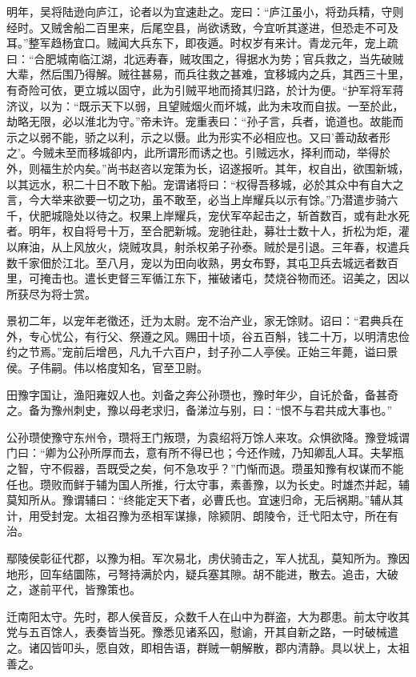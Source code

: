 \documentclass[12pt,UTF8]{ctexbook}
\begin{document}
明年，吴将陆逊向庐江，论者以为宜速赴之。宠曰：“庐江虽小，将劲兵精，守则经时。又贼舍船二百里来，后尾空县，尚欲诱致，今宜听其遂进，但恐走不可及耳。”整军趋杨宜口。贼闻大兵东下，即夜遁。时权岁有来计。青龙元年，宠上疏曰：“合肥城南临江湖，北远寿春，贼攻围之，得据水为势；官兵救之，当先破贼大辈，然后围乃得解。贼往甚易，而兵往救之甚难，宜移城内之兵，其西三十里，有奇险可依，更立城以固守，此为引贼平地而掎其归路，於计为便。“护军将军蒋济议，以为：“既示天下以弱，且望贼烟火而坏城，此为未攻而自拔。一至於此，劫略无限，必以淮北为守。”帝未许。宠重表曰：“孙子言，兵者，诡道也。故能而示之以弱不能，骄之以利，示之以慑。此为形实不必相应也。又曰'善动敌者形之'。今贼未至而移城卻内，此所谓形而诱之也。引贼远水，择利而动，举得於外，则福生於内矣。”尚书赵咨以宠策为长，诏遂报听。其年，权自出，欲围新城，以其远水，积二十日不敢下船。宠谓诸将曰：“权得吾移城，必於其众中有自大之言，今大举来欲要一切之功，虽不敢至，必当上岸耀兵以示有馀。”乃潜遣步骑六千，伏肥城隐处以待之。权果上岸耀兵，宠伏军卒起击之，斩首数百，或有赴水死者。明年，权自将号十万，至合肥新城。宠驰往赴，募壮士数十人，折松为炬，灌以麻油，从上风放火，烧贼攻具，射杀权弟子孙泰。贼於是引退。三年春，权遣兵数千家佃於江北。至八月，宠以为田向收熟，男女布野，其屯卫兵去城远者数百里，可掩击也。遣长吏督三军循江东下，摧破诸屯，焚烧谷物而还。诏美之，因以所获尽为将士赏。

景初二年，以宠年老徵还，迁为太尉。宠不治产业，家无馀财。诏曰：“君典兵在外，专心忧公，有行父、祭遵之风。赐田十顷，谷五百斛，钱二十万，以明清忠俭约之节焉。”宠前后增邑，凡九千六百户，封子孙二人亭侯。正始三年薨，谥曰景侯。子伟嗣。伟以格度知名，官至卫尉。

田豫字国让，渔阳雍奴人也。刘备之奔公孙瓒也，豫时年少，自讬於备，备甚奇之。备为豫州刺史，豫以母老求归，备涕泣与别，曰：“恨不与君共成大事也。”

公孙瓒使豫守东州令，瓒将王门叛瓒，为袁绍将万馀人来攻。众惧欲降。豫登城谓门曰：“卿为公孙所厚而去，意有所不得已也；今还作贼，乃知卿乱人耳。夫挈瓶之智，守不假器，吾既受之矣，何不急攻乎？”门惭而退。瓒虽知豫有权谋而不能任也。瓒败而鲜于辅为国人所推，行太守事，素善豫，以为长史。时雄杰并起，辅莫知所从。豫谓辅曰：“终能定天下者，必曹氏也。宜速归命，无后祸期。”辅从其计，用受封宠。太祖召豫为丞相军谋掾，除颍阴、朗陵令，迁弋阳太守，所在有治。

鄢陵侯彰征代郡，以豫为相。军次易北，虏伏骑击之，军人扰乱，莫知所为。豫因地形，回车结圜陈，弓弩持满於内，疑兵塞其隙。胡不能进，散去。追击，大破之，遂前平代，皆豫策也。

迁南阳太守。先时，郡人侯音反，众数千人在山中为群盗，大为郡患。前太守收其党与五百馀人，表奏皆当死。豫悉见诸系囚，慰谕，开其自新之路，一时破械遣之。诸囚皆叩头，愿自效，即相告语，群贼一朝解散，郡内清静。具以状上，太祖善之。
\end{document}
